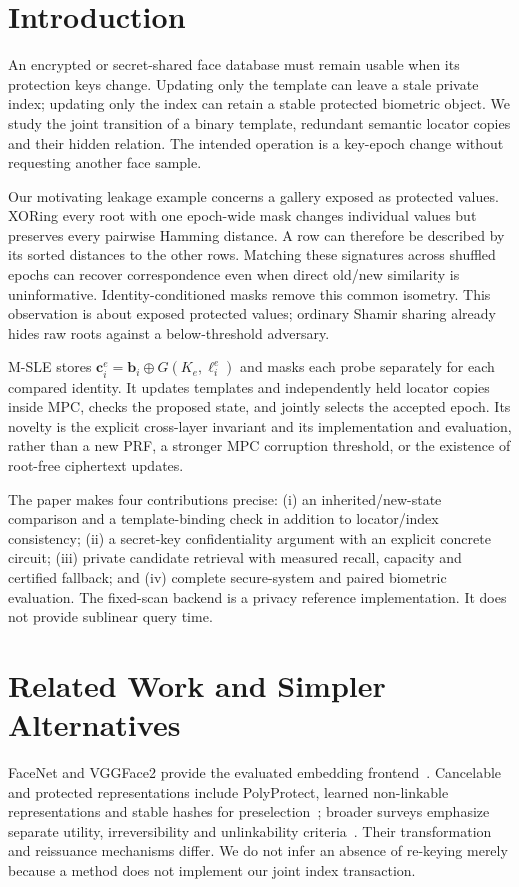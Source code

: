 \documentclass[journal]{IEEEtran}
\newcommand{\MSLE}{\textsc{M-SLE}\xspace}
\begin{document}
\section{Introduction}
An encrypted or secret-shared face database must remain usable when its protection keys change. Updating only the template can leave a stale private index; updating only the index can retain a stable protected biometric object. We study the joint transition of a binary template, redundant semantic locator copies and their hidden relation. The intended operation is a key-epoch change without requesting another face sample.

Our motivating leakage example concerns a gallery exposed as protected values. XORing every root with one epoch-wide mask changes individual values but preserves every pairwise Hamming distance. A row can therefore be described by its sorted distances to the other rows. Matching these signatures across shuffled epochs can recover correspondence even when direct old/new similarity is uninformative. Identity-conditioned masks remove this common isometry. This observation is about exposed protected values; ordinary Shamir sharing already hides raw roots against a below-threshold adversary.

\MSLE stores $\mathbf c_i^e=\mathbf b_i\oplus G(K_e,\ell_i^e)$ and masks each probe separately for each compared identity. It updates templates and independently held locator copies inside MPC, checks the proposed state, and jointly selects the accepted epoch. Its novelty is the explicit cross-layer invariant and its implementation and evaluation, rather than a new PRF, a stronger MPC corruption threshold, or the existence of root-free ciphertext updates.

The paper makes four contributions precise: (i) an inherited/new-state comparison and a template-binding check in addition to locator/index consistency; (ii) a secret-key confidentiality argument with an explicit concrete circuit; (iii) private candidate retrieval with measured recall, capacity and certified fallback; and (iv) complete secure-system and paired biometric evaluation. The fixed-scan backend is a privacy reference implementation. It does not provide sublinear query time.

\section{Related Work and Simpler Alternatives}
FaceNet and VGGFace2 provide the evaluated embedding frontend~\cite{schroff2015facenet,cao2018vggface2}. Cancelable and protected representations include PolyProtect, learned non-linkable representations and stable hashes for preselection~\cite{hahn2022polyprotect,pinto2021securetriplet,osorioroig2022stablehash}; broader surveys emphasize separate utility, irreversibility and unlinkability criteria~\cite{krivokuca2023survey}. Their transformation and reissuance mechanisms differ. We do not infer an absence of re-keying merely because a method does not implement our joint index transaction.
\end{document}

